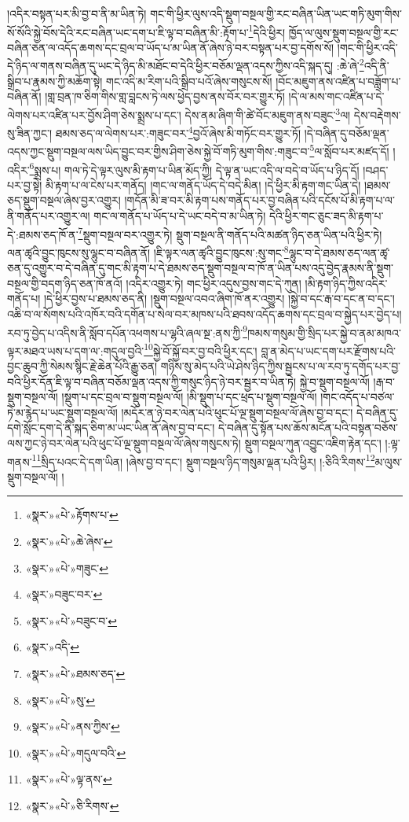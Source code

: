 །འདིར་བསྟན་པར་མི་བྱ་བ་ནི་མ་ཡིན་ཏེ། གང་གི་ཕྱིར་ལུས་འདི་སྡུག་བསྔལ་གྱི་རང་བཞིན་ཡིན་ཡང་གཏི་མུག་གིས་སོ་སོའི་སྐྱེ་བོས་དེའི་རང་བཞིན་ཡང་དག་པ་ཇི་ལྟ་བ་བཞིན་མི་:རྟོག་པ་\footnote{«སྣར་»«པེ་»རྟོགས་པ་}དེའི་ཕྱིར། ཁྱོད་ལ་ལུས་སྡུག་བསྔལ་གྱི་རང་བཞིན་ཅན་ལ་འདོད་ཆགས་དང་བྲལ་བ་ཡོད་པ་མ་ཡིན་ནོ་ཞེས་ཉེ་བར་བསྟན་པར་བྱ་དགོས་སོ། །གང་གི་ཕྱིར་འདི་དེ་ཉིད་ལ་གནས་བཞིན་དུ་ཡང་དེ་ཉིད་མི་མཐོང་བ་དེའི་ཕྱིར་བཅོམ་ལྡན་འདས་ཀྱིས་འདི་སྐད་དུ། :ཆེ་ཞེ་\footnote{«སྣར་»«པེ་»ཆེ་ཞེས་}འདི་ནི་སྒྲིབ་པ་རྣམས་ཀྱི་མཆོག་སྟེ། གང་འདི་མ་རིག་པའི་སྒྲིབ་པའོ་ཞེས་གསུངས་སོ། །བོང་མཇུག་ནས་འཛིན་པ་བཟློག་པ་བཞིན་ནོ། །གླ་བྲན་ཁ་ཅིག་གིས་གླ་བླངས་ཏེ་ལས་ཕྱེད་བྱས་ནས་བོར་བར་གྱུར་ཏོ། །དེ་ལ་མས་གང་འཛིན་པ་དེ་ལེགས་པར་འཛིན་པར་བྱོས་ཤིག་ཅེས་སྨྲས་པ་དང་། དེས་ནམ་ཞིག་གི་ཚེ་བོང་མཇུག་ནས་བཟུང་\footnote{«སྣར་»«པེ་»གཟུང་}ལ། དེས་བརྡེགས་སུ་ཟིན་ཀྱང་། ཐམས་ཅད་ལ་ལེགས་པར་:གཟུང་བར་\footnote{«སྣར་»བཟུང་བར་}བྱའོ་ཞེས་མི་གཏོང་བར་གྱུར་ཏོ། །དེ་བཞིན་དུ་བཅོམ་ལྡན་འདས་ཀྱང་སྡུག་བསྔལ་ལས་ཡིད་བྱུང་བར་གྱིས་ཤིག་ཅེས་སྐྱེ་བོ་གཏི་མུག་གིས་:གཟུང་བ་\footnote{«སྣར་»«པེ་»བཟུང་བ་}ལ་སློབ་པར་མཛད་དོ། །འདིར་\footnote{«སྣར་»འདི་}སྨྲས་པ། གལ་ཏེ་དེ་ལྟར་ལུས་མི་རྟག་པ་ཡིན་མོད་ཀྱི། དེ་ལྟ་ན་ཡང་འདི་ལ་བདེ་བ་ཡོད་པ་ཉིད་དོ། །བཤད་པར་བྱ་སྟེ། མི་རྟག་པ་ལ་ངེས་པར་གནོད། །གང་ལ་གནོད་ཡོད་དེ་བདེ་མིན། །དེ་ཕྱིར་མི་རྟག་གང་ཡིན་དེ། །ཐམས་ཅད་སྡུག་བསྔལ་ཞེས་བྱར་འགྱུར། །གདོན་མི་ཟ་བར་མི་རྟག་པས་གནོད་པར་བྱ་བཞིན་པའི་དངོས་པོ་མི་རྟག་པ་ལ་ནི་གནོད་པར་འགྱུར་ལ། གང་ལ་གནོད་པ་ཡོད་པ་དེ་ཡང་བདེ་བ་མ་ཡིན་ཏེ། དེའི་ཕྱིར་གང་ཅུང་ཟད་མི་རྟག་པ་དེ་:ཐམས་ཅད་ཁོ་ན་\footnote{«སྣར་»«པེ་»ཐམས་ཅད་}སྡུག་བསྔལ་བར་འགྱུར་ཏེ། སྡུག་བསྔལ་ནི་གནོད་པའི་མཚན་ཉིད་ཅན་ཡིན་པའི་ཕྱིར་ཏེ། ལན་ཚྭའི་བྱུང་ཁུངས་སུ་ལྷུང་བ་བཞིན་ནོ། །ཇི་ལྟར་ལན་ཚྭའི་བྱུང་ཁུངས་:སུ་གང་\footnote{«སྣར་»«པེ་»སུ་}ལྷུང་བ་དེ་ཐམས་ཅད་ལན་ཚྭ་ཅན་དུ་འགྱུར་བ་དེ་བཞིན་དུ་གང་མི་རྟག་པ་དེ་ཐམས་ཅད་སྡུག་བསྔལ་བ་ཁོ་ན་ཡིན་པས་འདུ་བྱེད་རྣམས་ནི་སྡུག་བསྔལ་གྱི་བདག་ཉིད་ཅན་ཁོ་ནའོ། །འདིར་འགྱུར་ཏེ། གང་ཕྱིར་འདུས་བྱས་གང་དེ་ཀུན། །མི་རྟག་ཉིད་ཀྱིས་འདིར་གནོད་པ། །དེ་ཕྱིར་བྱས་པ་ཐམས་ཅད་ནི། །སྡུག་བསྔལ་འབའ་ཞིག་ཁོ་ནར་འགྱུར། །སྐྱེ་བ་དང་རྒ་བ་དང་ན་བ་དང་། འཆི་བ་ལ་སོགས་པའི་འཁོར་བའི་དགོན་པ་སེལ་བར་མཁས་པའི་ཐབས་འདོད་ཆགས་དང་བྲལ་བ་སྐྱེད་པར་བྱེད་པ། རབ་ཏུ་བྱེད་པ་འདིས་ནི་སློབ་དཔོན་འཕགས་པ་ལྷའི་ཞལ་སྔ་:ནས་ཀྱི་\footnote{«སྣར་»«པེ་»ནས་ཀྱིས་}ཁམས་གསུམ་གྱི་སྲིད་པར་སྐྱེ་བ་ནམ་མཁའ་ལྟར་མཐའ་ཡས་པ་དག་ལ་:གདུལ་བྱའི་\footnote{«སྣར་»«པེ་»གདུལ་བའི་}སྐྱེ་བོ་སྐྱོ་བར་བྱ་བའི་ཕྱིར་དང་། བླ་ན་མེད་པ་ཡང་དག་པར་རྫོགས་པའི་བྱང་ཆུབ་ཀྱི་སེམས་སྙིང་རྗེ་ཆེན་པོའི་རྒྱུ་ཅན། གཉིས་སུ་མེད་པའི་ཡེ་ཤེས་ཉིད་ཀྱིས་སྦྱངས་པ་ལ་རབ་ཏུ་དགོད་པར་བྱ་བའི་ཕྱིར་དོན་ཇི་ལྟ་བ་བཞིན་བཅོམ་ལྡན་འདས་ཀྱི་གསུང་ཉིད་ཉེ་བར་སྦྱར་བ་ཡིན་ཏེ། སྐྱེ་བ་སྡུག་བསྔལ་ལོ། །རྒ་བ་སྡུག་བསྔལ་ལོ། །སྡུག་པ་དང་བྲལ་བ་སྡུག་བསྔལ་ལོ། །མི་སྡུག་པ་དང་ཕྲད་པ་སྡུག་བསྔལ་ལོ། །གང་འདོད་པ་བཙལ་ཏེ་མ་རྙེད་པ་ཡང་སྡུག་བསྔལ་ལོ། །མདོར་ན་ཉེ་བར་ལེན་པའི་ཕུང་པོ་ལྔ་སྡུག་བསྔལ་ལོ་ཞེས་བྱ་བ་དང་། དེ་བཞིན་དུ་དགེ་སློང་དག་དེ་ནི་སྐད་ཅིག་མ་ཡང་ཡིན་ནོ་ཞེས་བྱ་བ་དང་། དེ་བཞིན་དུ་སྟོན་པས་ཆོས་མངོན་པའི་བསྟན་བཅོས་ལས་ཀྱང་ཉེ་བར་ལེན་པའི་ཕུང་པོ་ལྔ་སྡུག་བསྔལ་ལོ་ཞེས་གསུངས་ཏེ། སྡུག་བསྔལ་ཀུན་འབྱུང་འཇིག་རྟེན་དང་། །:ལྟ་གནས་\footnote{«སྣར་»«པེ་»ལྟ་ནས་}སྲིད་པའང་དེ་དག་ཡིན། །ཞེས་བྱ་བ་དང་། སྡུག་བསྔལ་ཉིད་གསུམ་ལྡན་པའི་ཕྱིར། །:ཅིའི་རིགས་\footnote{«སྣར་»«པེ་»ཅི་རིགས་}མ་ལུས་སྡུག་བསྔལ་ལོ། །
